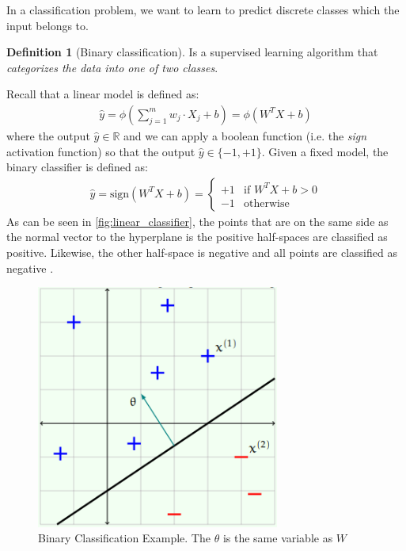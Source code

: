\documentclass[11pt]{article}
\numberwithin{equation}{section}
\theoremstyle{definition}%
\newtheorem{definition}{Definition}[section]%
\begin{document}
In a classification problem, we want to learn to predict discrete classes which the input belongs to. 

\begin{definition}[Binary classification] Is a supervised learning algorithm that \emph{categorizes the data into one of two classes}.
\end{definition}

Recall that a linear model is defined as: 
\begin{align}
    \hat{y} = \phi \left (\sum_{j=1}^{m}{w_j \cdot X_j + b} \right ) = \phi (W^{T}X + b)
\end{align}
% 
where the output $\hat{y} \in \mathbb{R}$ and we can apply a boolean function (i.e. the \emph{sign} activation function) so that the output $\hat{y} \in \{-1, +1\}$. Given a fixed model, the binary classifier is defined as:
\begin{align}
    \hat{y} = \text{sign}(W^{T}X + b) = \begin{cases}
        +1 & \text{if $W^{T}X + b > 0$}\\
        -1 & \text{otherwise}
    \end{cases}
\end{align}
As can be seen in \autoref{fig:linear_classifier}, the points that are on the same side as the normal vector to the hyperplane is the positive half-spaces are classified as positive. Likewise, the other half-space is negative and all points are classified as negative \cite{MIT}. 
\begin{figure}[h]%
    \centering
    \includegraphics[width=8cm]{./Figs/linear_classifer.png}%
    \qquad
    \caption{Binary Classification Example. The $\theta$ is the same variable as $W$ \cite{MIT}}%
    \label{fig:linear_classifier}%
\end{figure}
\end{document}
